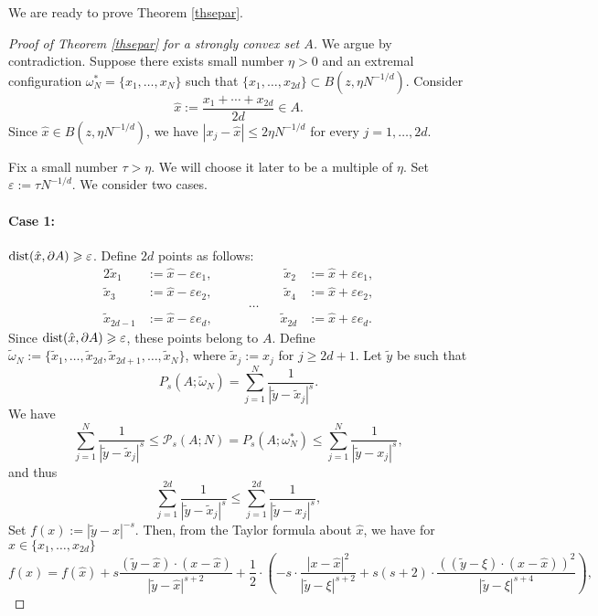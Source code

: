 \documentclass[12pt]{amsart}
\theoremstyle{definition}
\def\sli{\sum\limits}
\def\ep{\varepsilon}
\newcommand{\1}{\mathbf{1}}
\newcommand{\PP}{\mathcal{P}}
\begin{document}
We are ready to prove Theorem \ref{thsepar}.
\begin{proof}[Proof of Theorem \ref{thsepar} for a strongly convex set $A$]
We argue by contradiction. Suppose there exists small number $\eta>0$ and an extremal configuration $\omega^*_N=\{x_1, \ldots, x_N\}$ such that $\{x_1, \ldots, x_{2d}\}\subset B(z, \eta N^{-1/d})$. Consider
$$
\hat{x}:=\frac{x_1+\cdots+x_{2d}}{2d}\in A.
$$
Since $\hat{x}\in B(z, \eta N^{-1/d})$, we have $|x_j-\hat{x}|\leqslant 2\eta N^{-1/d}$ for every $j=1,\ldots, 2d$.

Fix a small number $\tau>\eta$. We will choose it later to be a multiple of $\eta$. Set $\ep:=\tau N^{-1/d}$. We consider two cases.
\paragraph{\bf{Case 1:}} $\textup{dist}(\hat{x}, \partial A)\geqslant \ep$.
Define $2d$ points as follows:
\begin{alignat*}{2}
\tilde{x}_1&:=\hat{x}-\ep e_1,& \;\;\;\; \tilde{x}_2&:=\hat{x}+\ep e_1,\\
\tilde{x}_3&:=\hat{x}-\ep e_2,& \;\;\;\; \tilde{x}_4&:=\hat{x}+\ep e_2,\\
 &\qquad \qquad\qquad \qquad\ldots\\
\tilde{x}_{2d-1}&:=\hat{x}-\ep e_d,& \;\;\; \tilde{x}_{2d}&:=\hat{x}+\ep e_d.
\end{alignat*}
Since $\textup{dist}(\hat{x}, \partial A)\geqslant\ep$, these points belong to $A$. Define $\widetilde{\omega}_N:=\{\tilde{x}_1, \ldots, \tilde{x}_{2d}, \tilde{x}_{2d+1}, \ldots, \tilde{x}_{N}\}$, where $\tilde{x}_j:=x_j$ for $j\geqslant 2d+1$.
Let $\tilde{y}$ be such that
\begin{equation}\label{ytildedefin}
P_s(A; \widetilde\omega_N)=\sli_{j=1}^N\frac{1}{|\tilde{y}-\tilde{x}_j|^s}.
\end{equation}
We have
$$
\sli_{j=1}^N\frac{1}{|\tilde{y}-\tilde{x}_j|^s} \leqslant \PP_s(A; N)=P_s(A; \omega^*_N) \leqslant \sli_{j=1}^N\frac{1}{|\tilde{y}-x_j|^s},
$$
and thus
\begin{equation}\label{mainineqconvex}
\sli_{j=1}^{2d}\frac{1}{|\tilde{y}-\tilde{x}_j|^s} \leqslant \sli_{j=1}^{2d}\frac{1}{|\tilde{y}-x_j|^s},
\end{equation}
Set $f(x):=|\tilde{y}-x|^{-s}$.  Then, from the Taylor formula about $\hat{x}$, we have for $x\in\{x_1,\ldots, x_{2d}\}$
$$
f(x)=f(\hat{x}) + s\frac{(\tilde y-\hat{x})\cdot (x-\hat{x})}{|\tilde y-\hat{x}|^{s+2}} + \frac{1}2 \cdot\left(-s\cdot \frac{|x-\hat{x}|^2}{|\tilde y-\xi|^{s+2}}+s(s+2)\cdot \frac{((\tilde y-\xi)\cdot (x-\hat{x}))^2}{|\tilde y-\xi|^{s+4}}\right),
$$
\end{proof}
\end{document}
